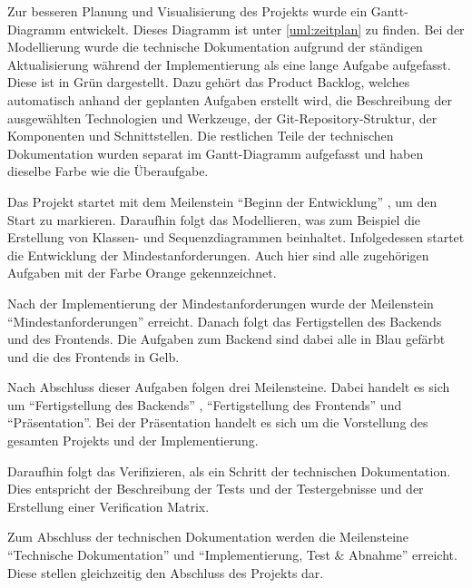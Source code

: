 Zur besseren Planung und Visualisierung des Projekts wurde ein Gantt-Diagramm entwickelt.
Dieses Diagramm ist unter \autoref{uml:zeitplan} zu finden.
Bei der Modellierung wurde die technische Dokumentation aufgrund der ständigen Aktualisierung während
der Implementierung als eine lange Aufgabe aufgefasst.
Diese ist in Grün dargestellt.
Dazu gehört das Product Backlog, welches automatisch anhand der geplanten Aufgaben erstellt wird,
die Beschreibung der ausgewählten Technologien und Werkzeuge, der Git-Repository-Struktur,
der Komponenten und Schnittstellen.
Die restlichen Teile der technischen Dokumentation wurden separat im Gantt-Diagramm aufgefasst und haben dieselbe Farbe
wie die Überaufgabe. \medskip

Das Projekt startet mit dem Meilenstein \enquote{Beginn der Entwicklung} , um den Start zu markieren.
Daraufhin folgt das Modellieren, was zum Beispiel die Erstellung von Klassen- und Sequenzdiagrammen beinhaltet.
Infolgedessen startet die Entwicklung der Mindestanforderungen.
Auch hier sind alle zugehörigen Aufgaben mit der Farbe Orange gekennzeichnet. \medskip

Nach der Implementierung der Mindestanforderungen wurde der Meilenstein \enquote{Mindestanforderungen} erreicht.
Danach folgt das Fertigstellen des Backends und des Frontends.
Die Aufgaben zum Backend sind dabei alle in Blau gefärbt und die des Frontends in Gelb. \medskip

Nach Abschluss dieser Aufgaben folgen drei Meilensteine.
Dabei handelt es sich um \enquote{Fertigstellung des Backends} , \enquote{Fertigstellung des Frontends} und \enquote{Präsentation}.
Bei der Präsentation handelt es sich um die Vorstellung des gesamten Projekts und der Implementierung. \medskip

Daraufhin folgt das Verifizieren, als ein Schritt der technischen Dokumentation.
Dies entspricht der Beschreibung der Tests und der Testergebnisse und der Erstellung einer Verification Matrix. \medskip

Zum Abschluss der technischen Dokumentation werden die Meilensteine \enquote{Technische Dokumentation} und
\enquote{Implementierung, Test \& Abnahme} erreicht.
Diese stellen gleichzeitig den Abschluss des Projekts dar.